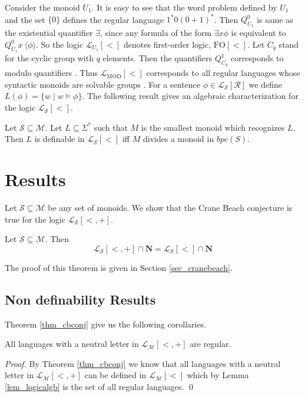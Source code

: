 \documentclass[envcountsame]{llncs}
\newcommand{\mon}[2]{Q_{#1}^{#2}}
\newcommand{\FO}{\mathrm{FO}}
\newcommand{\MOD}{\mathrm{MOD}}
\newcommand{\NL}{\mathbf{N}}
\begin{document}
Consider the monoid $U_1$. It is easy to see that the word problem defined by $U_1$ and the set $\{0\}$ defines the regular language
$1^*0(0+1)^*$. Then $\mon{U_1}{0}$ is same as the existential quantifier $\exists$, since any formula of the form $\exists x \phi$ is equivalent
to $\mon{U_1}{0} x ~\langle \phi \rangle$. So the logic $\mathcal{L}_{U_1}[<]$ denotes first-order logic, $\FO[<]$. Let
$C_q$ stand for the cyclic group with $q$ elements. Then the quantifiers $\mon{C_q}{1}$ corresponds to modulo quantifiers
\cite{str_regGenQnt}. Thus $\mathcal{L}_{\MOD}[<]$ corresponds to all regular languages whose syntactic monoids are solvable groups
\cite{str_cirBook}. 
For a sentence $\phi \in \mathcal{L_S}[\mathcal R]$ we define $L(\phi) = \{w \mid w \vDash \phi\}$.
The following result gives an algebraic characterization for the logic $\mathcal{L_S}[<]$.
\begin{lemma}
\label{lem_logicalgb}
Let $\mathcal{S \subseteq M}$. 
Let $L \subseteq \Sigma^*$ such that $M$ is the smallest monoid which recognizes $L$. 
Then $L$ is definable in $\mathcal{L_S}[<]$ iff $M$ divides a monoid in $bpc(S)$.
\end{lemma}
\bigskip
\section{Results}\label{sec_result} 
Let $\mathcal{S \subseteq M}$ be any set of monoids. 
We show that the Crane Beach conjecture is true for the logic $\mathcal{L_S}[<,+]$.
\begin{theorem}
\label{thm_cbconj}
 Let $\mathcal{S \subseteq M}$. Then $$\mathcal{L_S}[<,+] \cap \NL = \mathcal{L}_{\mathcal{S}}[<] \cap \NL$$
\end{theorem}
The proof of this theorem is given in Section \ref{sec_cranebeach}.



\subsection{Non definability Results}

Theorem \ref{thm_cbconj} give us the following corollaries. 
\begin{corollary} 
\label{cor_regLang}
All languages with a neutral letter in $\mathcal{L_M}[<,+]$ are regular.
\end{corollary}
\begin{proof}
 By Theorem \ref{thm_cbconj} we know that all languages with a neutral letter in $\mathcal{L_M}[<,+]$ can be defined in $\mathcal{L_M}[<]$ which by Lemma \ref{lem_logicalgb} is the set of all regular languages.
\qed \end{proof}
\end{document}

